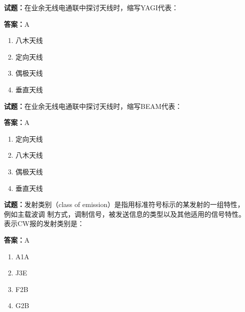 \documentclass{ctexbook}
\begin{document}




\vspace{1em}

\textbf{试题：}在业余无线电通联中探讨天线时，缩写YAGI代表： 

\textbf{答案：}A 

\begin{enumerate}[leftmargin=3em]
  \item 八木天线 

  \item 定向天线 

  \item 偶极天线 

  \item 垂直天线 

\end{enumerate}





\vspace{1em}

\textbf{试题：}在业余无线电通联中探讨天线时，缩写BEAM代表： 

\textbf{答案：}A 

\begin{enumerate}[leftmargin=3em]
  \item 定向天线 

  \item 八木天线 

  \item 偶极天线 

  \item 垂直天线 

\end{enumerate}





\vspace{1em}

\textbf{试题：}发射类别（class of emission）是指用标准符号标示的某发射的一组特性，例如主载波调
制方式，调制信号，被发送信息的类型以及其他适用的信号特性。表示CW报的发射类别是： 

\textbf{答案：}A 

\begin{enumerate}[leftmargin=3em]
  \item A1A 

  \item J3E 

  \item F2B 

  \item G2B 

\end{enumerate}
\end{document}
